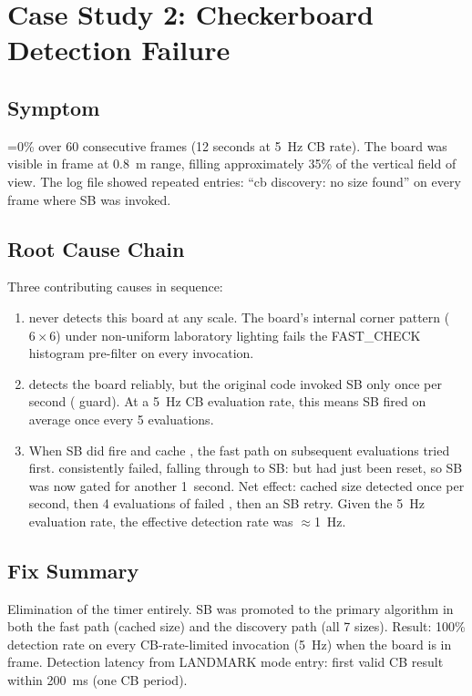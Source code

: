 \section{Case Study 2: Checkerboard Detection Failure}

\subsection{Symptom}

=0\% over 60 consecutive frames (12 seconds at 5~Hz CB rate). The board was visible in frame at 0.8~m range, filling approximately 35\% of the vertical field of view. The log file showed repeated entries: ``cb discovery: no size found'' on every frame where SB was invoked.

\subsection{Root Cause Chain}

Three contributing causes in sequence:

\begin{enumerate}[leftmargin=1.6em]
  \item {} never detects this board at any scale. The board's internal corner pattern ($6\times6$) under non-uniform laboratory lighting fails the FAST\_CHECK histogram pre-filter on every invocation.
  \item {} detects the board reliably, but the original code invoked SB only once per second ( guard). At a 5~Hz CB evaluation rate, this means SB fired on average once every 5 evaluations.
  \item When SB did fire and cache , the fast path on subsequent evaluations tried  first.  consistently failed, falling through to SB: but  had just been reset, so SB was now gated for another 1~second. Net effect: cached size detected once per second, then 4 evaluations of failed , then an SB retry. Given the 5~Hz evaluation rate, the effective detection rate was $\approx$1~Hz.
\end{enumerate}

\subsection{Fix Summary}

Elimination of the  timer entirely. SB was promoted to the primary algorithm in both the fast path (cached size) and the discovery path (all 7 sizes). Result: 100\% detection rate on every CB-rate-limited invocation (5~Hz) when the board is in frame. Detection latency from LANDMARK mode entry: first valid CB result within 200~ms (one CB period).

